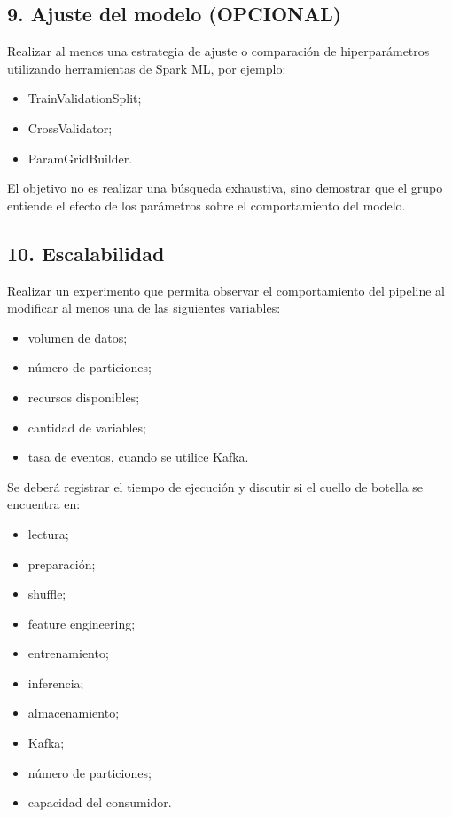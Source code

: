 \documentclass[11pt,a4paper]{article}
\begin{document}
\subsection{9. Ajuste del modelo (OPCIONAL)}

Realizar al menos una estrategia de ajuste o comparación de hiperparámetros utilizando
herramientas de Spark ML, por ejemplo:

\begin{itemize}
  \item TrainValidationSplit;
  \item CrossValidator;
  \item ParamGridBuilder.
\end{itemize}

El objetivo no es realizar una búsqueda exhaustiva, sino demostrar que el grupo entiende el
efecto de los parámetros sobre el comportamiento del modelo.

\subsection{10. Escalabilidad}

Realizar un experimento que permita observar el comportamiento del pipeline al modificar al
menos una de las siguientes variables:

\begin{itemize}
  \item volumen de datos;
  \item número de particiones;
  \item recursos disponibles;
  \item cantidad de variables;
  \item tasa de eventos, cuando se utilice Kafka.
\end{itemize}

Se deberá registrar el tiempo de ejecución y discutir si el cuello de botella se encuentra
en:

\begin{itemize}
  \item lectura;
  \item preparación;
  \item shuffle;
  \item feature engineering;
  \item entrenamiento;
  \item inferencia;
  \item almacenamiento;
  \item Kafka;
  \item número de particiones;
  \item capacidad del consumidor.
\end{itemize}
\end{document}
